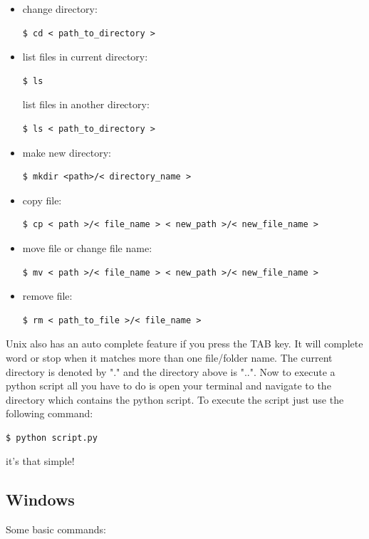 \documentclass{SciPost}
\newcommand\0{\scalebox{-1}[1]{0}}
\let\svttfamily\ttfamily
\renewcommand\ttfamily{\svttfamily\catcode`0=\active }
\begin{document}
\begin{appendix}
\begin{itemize}
	\item change directory:
	\begin{lstlisting}[numbers=none,keywordstyle=\ttfamily]
	$ cd < path_to_directory >
	\end{lstlisting}
	\item list files in current directory:
	\begin{lstlisting}[numbers=none,keywordstyle=\ttfamily]
	$ ls 
	\end{lstlisting}
	list files in another directory:
	\begin{lstlisting}[numbers=none,keywordstyle=\ttfamily]
	$ ls < path_to_directory >
	\end{lstlisting}
	\item make new directory:
	\begin{lstlisting}[numbers=none,keywordstyle=\ttfamily]
	$ mkdir <path>/< directory_name >
	\end{lstlisting}
	\item copy file:
	\begin{lstlisting}[numbers=none,keywordstyle=\ttfamily]
	$ cp < path >/< file_name > < new_path >/< new_file_name >
	\end{lstlisting}
	\item move file or change file name:
	\begin{lstlisting}[numbers=none]
	$ mv < path >/< file_name > < new_path >/< new_file_name >
	\end{lstlisting}
	\item remove file:
	\begin{lstlisting}[numbers=none,keywordstyle=\ttfamily]
	$ rm < path_to_file >/< file_name >
	\end{lstlisting}
	
\end{itemize}
Unix also has an auto complete feature if you press the TAB key. It will complete word or stop when it matches more than one file/folder name. The current directory is denoted by "." and the directory above is "..".
%
Now to execute a python script all you have to do is open your terminal and navigate to the directory which contains the python script. To execute the script just use the following command:
\begin{lstlisting}[numbers=none,keywordstyle=\ttfamily]
$ python script.py
\end{lstlisting}
it's that simple!

\subsection{Windows}
Some basic commands:


\end{appendix}
\end{document}
